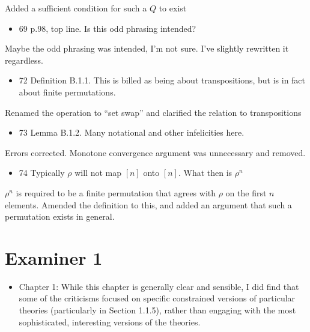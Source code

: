 Added a sufficient condition for such a $Q$ to exist

\begin{itemize}
    \item 69 p.98, top line. Is this odd phrasing intended?
\end{itemize}
 
Maybe the odd phrasing was intended, I'm not sure. I've slightly rewritten it regardless.

\begin{itemize}
    \item 72 Definition B.1.1. This is billed as being about transpositions,
but is in fact about finite permutations.
\end{itemize}

Renamed the operation to ``set swap'' and clarified the relation to transpositions

\begin{itemize}
    \item 73 Lemma B.1.2. Many notational and other infelicities here.
\end{itemize}
 
Errors corrected. Monotone convergence argument was unnecessary and removed.

\begin{itemize}
    \item 74 Typically $\rho$ will not map $[n]$ onto $[n]$. What then is $\rho^n$
\end{itemize}
 
$\rho^n$ is required to be a finite permutation that agrees with $\rho$ on the first $n$ elements. Amended the definition to this, and added an argument that such a permutation exists in general.


\section{Examiner 1}

\begin{itemize}
    \item Chapter 1: While this chapter is generally clear and sensible, I did find that some of the criticisms focused on specific constrained versions of particular theories (particularly in Section 1.1.5), rather than engaging with the most sophisticated, interesting versions of the theories.
\end{itemize}

